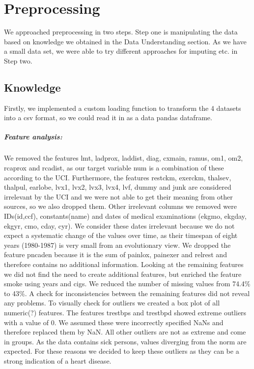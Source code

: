 \chapter{Preprocessing}
We approached preprocessing in two steps. Step one is manipulating the data based on knowledge we obtained in the Data Understanding section. 
As we have a small data set, we were able to try different approaches for imputing etc. in Step two.


\section{Knowledge}
Firstly, we implemented a custom loading function to transform the 4 datasets into a csv format, so we could read it in as a data pandas dataframe.

\paragraph{Feature analysis:}
We removed the features lmt, ladprox, laddist, diag, cxmain, ramus, om1, om2, rcaprox and rcadist, as our target variable num is a combination of these according to the UCI. Furthermore, the features restckm, exerckm, thalsev, thalpul, earlobe, lvx1, lvx2, lvx3, lvx4, lvf, dummy and junk are considered irrelevant by the UCI and we were not able to get their meaning from other sources, so we also dropped them. Other irrelevant columns we removed were IDs(id,ccf), constants(name) and dates of medical examinations (ekgmo, ekgday, ekgyr, cmo, cday, cyr). We consider these dates irrelevant because we do not expect a systematic change of the values over time, as their timespan of eight years (1980-1987) is very small from an evolutionary view. We dropped the feature pncaden because it is the sum of painlox, painexer and relrest and therefore contains no additional information. Looking at the remaining features we did not find the need to create additional features, but enriched the feature smoke using years and cigs. We reduced the number of missing values from 74.4\% to 43\%. A check for inconsistencies between the remaining features did not reveal any problems.
To visually check for outliers we created a box plot of all numeric(?) features. The features trestbps and trestbpd showed extreme outliers with a value of 0. We assumed these were incorrectly specified NaNs and therefore replaced them by NaN. All other outliers are not as extreme and come in groups. As the data contains sick persons, values diverging from the norm are expected. For these reasons we decided to keep these outliers as they can be a strong indication of a heart disease.
